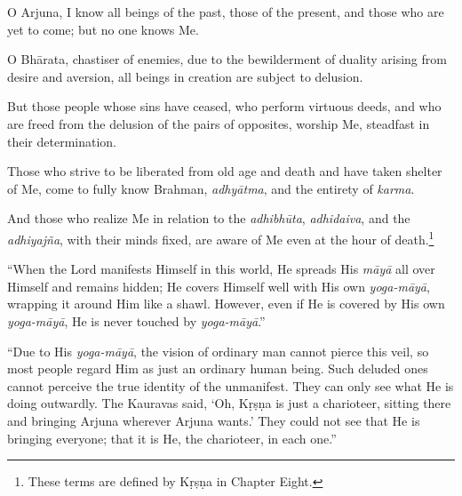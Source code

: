 {O Arjuna, I know all beings of the past, those of the present, and those who are yet to come; but no one knows Me.}

{O Bhārata, chastiser of enemies, due to the bewilderment of duality arising from desire and aversion, all beings in creation are subject to delusion.}

{But those people whose sins have ceased, who perform virtuous deeds, and who are freed from the delusion of the pairs of opposites, worship Me, steadfast in their determination.}

{Those who strive to be liberated from old age and death and have taken shelter of Me, come to fully know Brahman, \textit{adhyātma}, and the entirety of \textit{karma}.}

{And those who realize Me in relation to the \textit{adhibhūta}, \textit{adhidaiva}, and the \textit{adhiyajña}, with their minds fixed, are aware of Me even at the hour of death.\footnote{These terms are defined by Kṛṣṇa in Chapter Eight.}}

\enquote{When the Lord manifests Himself in this world, He spreads His \textit{māyā} all over Himself and remains hidden; He covers Himself well with His own \textit{yoga-māyā}, wrapping it around Him like a shawl. However, even if He is covered by His own \textit{yoga-māyā}, He is never touched by \textit{yoga-māyā}.}

\enquote{Due to His \textit{yoga-māyā}, the vision of ordinary man cannot pierce this veil, so most people regard Him as just an ordinary human being. Such deluded ones cannot perceive the true identity of the unmanifest. They can only see what He is doing outwardly. The Kauravas said, \enquote{Oh, Kṛṣṇa is just a charioteer, sitting there and bringing Arjuna wherever Arjuna wants.} They could not see that He is bringing everyone; that it is He, the charioteer, in each one.}

